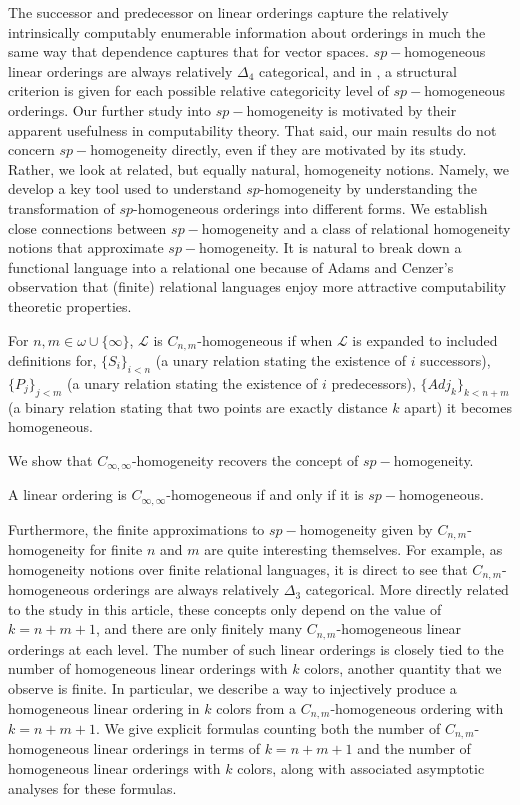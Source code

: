 \documentclass[11pt]{amsart}
\theoremstyle{definition}
\def\L{\mathcal L}
\begin{document}
The successor and predecessor on linear orderings capture the relatively intrinsically computably enumerable information about orderings in much the same way that dependence captures that for vector spaces.
$sp-$homogeneous linear orderings are always relatively $\Delta_4$ categorical, and in \cite{CCGHN}, a structural criterion is given for each possible relative categoricity level of $sp-$homogeneous orderings.
Our further study into $sp-$homogeneity is motivated by their apparent usefulness in computability theory.
That said, our main results do not concern $sp-$homogeneity directly, even if they are motivated by its study.
Rather, we look at related, but equally natural, homogeneity notions.
Namely, we develop a key tool used to understand $sp$-homogeneity by understanding the transformation of $sp$-homogeneous orderings into different forms.
We establish close connections between $sp-$homogeneity and a class of relational homogeneity notions that approximate $sp-$homogeneity.
It is natural to break down a functional language into a relational one because of Adams and Cenzer's observation that (finite) relational languages enjoy more attractive computability theoretic properties.
\begin{definition}
    For $n,m\in\omega\cup\{\infty\}$, $\L$ is $C_{n,m}$-homogeneous if when $\L$ is expanded to included definitions for, $\{S_i\}_{i<n}$ (a unary relation stating the existence of $i$ successors), $\{P_j\}_{j<m}$ (a unary relation stating the existence of $i$ predecessors), $\{Adj_k\}_{k<n+m}$ (a binary relation stating that two points are exactly distance $k$ apart) it becomes homogeneous.
\end{definition}
We show that $C_{\infty,\infty}$-homogeneity recovers the concept of $sp-$homogeneity.

\begin{theorem}
    A linear ordering is $C_{\infty,\infty}$-homogeneous if and only if it is $sp-$homogeneous.
\end{theorem}

Furthermore, the finite approximations to $sp-$homogeneity given by $C_{n,m}$-homogeneity for finite $n$ and $m$ are quite interesting themselves.
For example, as homogeneity notions over finite relational languages, it is direct to see that $C_{n,m}$-homogeneous orderings are always relatively $\Delta_3$ categorical.
More directly related to the study in this article, these concepts only depend on the value of $k=n+m+1$, and there are only finitely many $C_{n,m}$-homogeneous linear orderings at each level.
The number of such linear orderings is closely tied to the number of homogeneous linear orderings with $k$ colors, another quantity that we observe is finite.
In particular, we describe a way to injectively produce a homogeneous linear ordering in $k$ colors from a $C_{n,m}$-homogeneous ordering with $k=n+m+1$.
We give explicit formulas counting both the number of $C_{n,m}$-homogeneous linear orderings in terms of $k=n+m+1$ and the number of homogeneous linear orderings with $k$ colors, along with associated asymptotic analyses for these formulas.
\end{document}
